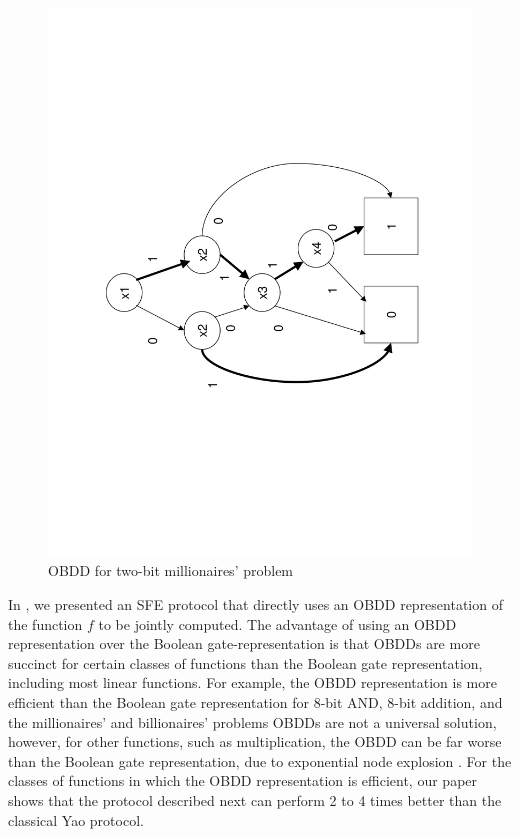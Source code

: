 %
\begin{figure}
\begin{centering}
\includegraphics[scale=0.4,angle=270]{obdd1}
\par\end{centering}

\caption{\label{fig:OBDD-example}OBDD for two-bit millionaires' problem}

\end{figure}


In \cite{kruger06}, we presented an SFE protocol that directly uses
an OBDD representation of the function $f$ to be jointly computed.
The advantage of using an OBDD representation over the Boolean gate-representation
is that OBDDs are more succinct for certain classes of functions than
the Boolean gate representation, including most linear functions.
For example, the OBDD representation is more efficient than the Boolean
gate representation for 8-bit AND, 8-bit addition, and the millionaires'
and billionaires' problems \cite{Yao86} OBDDs are not a universal
solution, however, for other functions, such as multiplication, the
OBDD can be far worse than the Boolean gate representation, due to
exponential node explosion \cite{Bryant:BDD}. For the classes of
functions in which the OBDD representation is efficient, our paper
\cite{kruger06} shows that the protocol described next can perform
2 to 4 times better than the classical Yao protocol.

